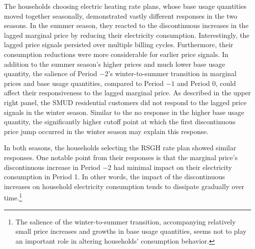 The households choosing electric heating rate plans, whose base usage quantities moved together seasonally, demonstrated vastly different responses in the two seasons. In the summer season, they reacted to the discontinuous increases in the lagged marginal price by reducing their electricity consumption. Interestingly, the lagged price signals persisted over multiple billing cycles. Furthermore, their consumption reductions were more considerable for earlier price signals. In addition to the summer season's higher prices and much lower base usage quantity, the salience of Period $-2$'s winter-to-summer transition in marginal prices and base usage quantities, compared to Period $-1$ and Period 0, could affect their responsiveness to the lagged marginal price. As described in the upper right panel, the SMUD residential customers did not respond to the lagged price signals in the winter season. Similar to the no response in the higher base usage quantity, the significantly higher cutoff point at which the first discontinuous price jump occurred in the winter season may explain this response. 

In both seasons, the households selecting the RSGH rate plan showed similar responses. One notable point from their responses is that the marginal price's discontinuous increase in Period $-2$ had minimal impact on their electricity consumption in Period 1. In other words, the impact of the discontinuous increases on household electricity consumption tends to dissipate gradually over time.\footnote{The salience of the winter-to-summer transition, accompanying relatively small price increases and growths in base usage quantities, seems not to play an important role in altering households' consumption behavior.} 
